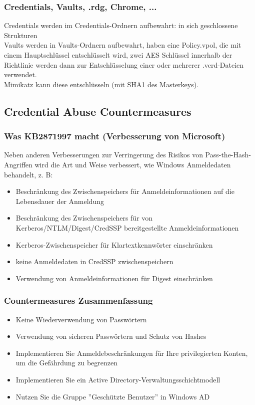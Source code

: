 \subsubsection{Credentials, Vaults, .rdg, Chrome, ...}
Credentials werden im Credentials-Ordnern aufbewahrt: in sich geschlossene Strukturen\\
Vaults werden in Vaults-Ordnern aufbewahrt, haben eine Policy.vpol, die mit einem Hauptschlüssel entschlüsselt wird, zwei AES Schlüssel innerhalb der Richtlinie werden dann zur Entschlüsselung einer oder mehrerer .vcrd-Dateien verwendet.\\
Mimikatz kann diese entschlüsseln (mit SHA1 des Masterkeys).

\subsection{Credential Abuse Countermeasures}
\subsubsection{Was KB2871997 macht (Verbesserung von Microsoft)}
Neben anderen Verbesserungen zur Verringerung des Risikos von Pass-the-Hash-Angriffen wird die Art und Weise verbessert, wie Windows Anmeldedaten behandelt, z. B:
\begin{itemize}
    \item Beschränkung des Zwischenspeichers für Anmeldeinformationen auf die Lebensdauer der Anmeldung
    \item Beschränkung des Zwischenspeichers für von Kerberos/NTLM/Digest/CredSSP bereitgestellte Anmeldeinformationen
    \item Kerberos-Zwischenspeicher für Klartextkennwörter einschränken
    \item keine Anmeldedaten in CredSSP zwischenspeichern
    \item Verwendung von Anmeldeinformationen für Digest einschränken
\end{itemize}

\subsubsection{Countermeasures Zusammenfassung}
\begin{itemize}
    \item Keine Wiederverwendung von Passwörtern
    \item Verwendung von sicheren Passwörtern und Schutz von Hashes
    \item Implementieren Sie Anmeldebeschränkungen für Ihre privilegierten Konten, um die Gefährdung zu begrenzen
    \item Implementieren Sie ein Active Directory-Verwaltungsschichtmodell
    \item Nutzen Sie die Gruppe ''Geschützte Benutzer'' in Windows AD
\end{itemize}


